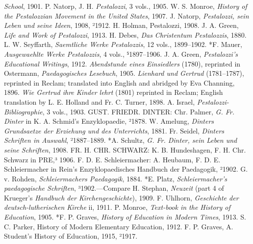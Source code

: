 \emph{School}, 1901. P. Natorp, J. H. \emph{Pestalozzi}, 3 vols., 1905. W. S. Monroe, \emph{History of the Pestalozzian Movement in the United States}, 1907. J. Natorp, \emph{Pestalozzi, sein Leben und seine Ideen}, 1908, ²1912. H. Holman, Pestalozzi, 1908. J. A. Green, \emph{Life and Work of Pestalozzi}, 1913. H. Debes, \emph{Das Christentum Pestalozzis}, 1880. L. W. Seyffarth, \emph{Saemtliche Werke Pestalozzis}, 12 vols., 1899–1902. *F. Mauer, \emph{Ausgewaehlte Werke Pestalozzis}, 4 vols., ⁵1897–1906. J. A. Green, \emph{Pestalozzi’s Educational Writings}, 1912. \emph{Abendstunde eines Einsiedlers} (1780), reprinted in Ostermann, \emph{Paedagogisches Lesebuch}, 1905. \emph{Lienhard und Gertrud} (1781–1787), reprinted in Reclam; translated into English and abridged by Eva Channing, 1896. \emph{Wie Gertrud ihre Kinder lehrt} (1801) reprinted in Reclam; English translation by L. E. Holland and Fr. C. Turner, 1898. A. Israel, \emph{Pestalozzi-Bibliographie}, 3 vols., 1903. GUST. FRIEDR. DINTER: Chr. Palmer, \emph{G. Fr. Dinter} in K. A. Schmid’s Enzyklopaedie, ²1878. W. Amelung, \emph{Dinters Grundsaetze der Erziehung und des Unterrichts}, 1881. Fr. Seidel, \emph{Dinters Schriften in Auswahl}, ²1887–1889. *A. Schultz, \emph{G. Fr. Dinter, sein Leben und seine Schriften}, 1908. FR. H. CHR. SCHWARZ: K. B. Hundeshagen, F. H. Chr. Schwarz in PRE,³ 1906. F. D. E. Schleiermacher: A. Heubaum, F. D. E. Schleiermacher in Rein’s Enzyklopaedisches Handbuch der Paedagogik, ²1902. G. v. Rohden, \emph{Schleiermachers Paedagogik}, 1884. *E. Platz, \emph{Schleiermacher’s paedagogische Schriften}, ³1902.—Compare H. Stephan, \emph{Neuzeit} (part 4 of Krueger’s \emph{Handbuch der Kirchengeschichte}), 1909. F. Uhlhorn, \emph{Geschichte der deutsch-lutherischen Kirche} ii, 1911. P. Monroe, \emph{Text-book in the History of Education}, 1905. *F. P. Graves, \emph{History of Education in Modern Times}, 1913. S. C. Parker, History of Modern Elementary Education, 1912. F. P. Graves, A. Student’s History of Education, 1915, ²1917.

